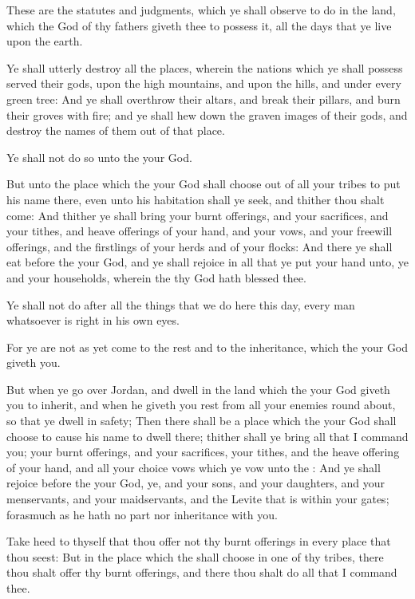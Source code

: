 \Chapter
\Verse These are the statutes and judgments, which ye shall observe to do in the land, which the \LORD God of thy fathers giveth thee to possess it, all the days that ye live upon the earth.

\Verse Ye shall utterly destroy all the places, wherein the nations which ye shall possess served their gods, upon the high mountains, and upon the hills, and under every green tree: \Verse And ye shall overthrow their altars, and break their pillars, and burn their groves with fire; and ye shall hew down the graven images of their gods, and destroy the names of them out of that place.

\Verse Ye shall not do so unto the \LORD your God.

\Verse But unto the place which the \LORD your God shall choose out of all your tribes to put his name there, even unto his habitation shall ye seek, and thither thou shalt come: \Verse And thither ye shall bring your burnt offerings, and your sacrifices, and your tithes, and heave offerings of your hand, and your vows, and your freewill offerings, and the firstlings of your herds and of your flocks: \Verse And there ye shall eat before the \LORD your God, and ye shall rejoice in all that ye put your hand unto, ye and your households, wherein the \LORD thy God hath blessed thee.

\Verse Ye shall not do after all the things that we do here this day, every man whatsoever is right in his own eyes.

\Verse For ye are not as yet come to the rest and to the inheritance, which the \LORD your God giveth you.

\Verse But when ye go over Jordan, and dwell in the land which the \LORD your God giveth you to inherit, and when he giveth you rest from all your enemies round about, so that ye dwell in safety; \Verse Then there shall be a place which the \LORD your God shall choose to cause his name to dwell there; thither shall ye bring all that I command you; your burnt offerings, and your sacrifices, your tithes, and the heave offering of your hand, and all your choice vows which ye vow unto the \LORD: \Verse And ye shall rejoice before the \LORD your God, ye, and your sons, and your daughters, and your menservants, and your maidservants, and the Levite that is within your gates; forasmuch as he hath no part nor inheritance with you.

\Verse Take heed to thyself that thou offer not thy burnt offerings in every place that thou seest: \Verse But in the place which the \LORD shall choose in one of thy tribes, there thou shalt offer thy burnt offerings, and there thou shalt do all that I command thee.

